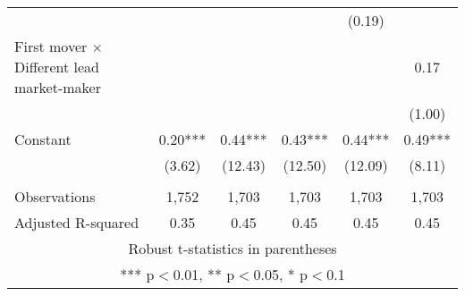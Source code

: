 \documentclass[]{article}
\begin{document}
\begin{tabular}{lccccc}
 &  &  &  & (0.19) &  \\
First mover $\times$ Different lead market-maker &  &  &  &  & 0.17 \\
 &  &  &  &  & (1.00) \\
Constant & 0.20*** & 0.44*** & 0.43*** & 0.44*** & 0.49*** \\
 & (3.62) & (12.43) & (12.50) & (12.09) & (8.11) \\
 &  &  &  &  &  \\
Observations & 1,752 & 1,703 & 1,703 & 1,703 & 1,703 \\
 Adjusted R-squared & 0.35 & 0.45 & 0.45 & 0.45 & 0.45 \\ \hline
\multicolumn{6}{c}{ Robust t-statistics in parentheses} \\
\multicolumn{6}{c}{ *** p$<$0.01, ** p$<$0.05, * p$<$0.1} \\
\end{tabular}
\end{document}
